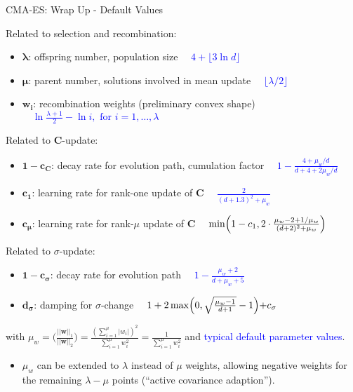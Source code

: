 \documentclass[11pt,compress,t,notes=noshow, xcolor=table]{beamer}
\begin{document}
\begin{vbframe}{CMA-ES: Wrap Up - Default Values} %
\scriptsize{
Related to selection and recombination:

\begin{itemize}
\item $\bm{\lambda}$: offspring number, population size \textcolor{blue}{$\quad 4 + \lfloor 3 \ln d\rfloor$}
\item $\bm{\mu}$: parent number, solutions involved in mean update \textcolor{blue}{$\quad \lfloor \lambda / 2\rfloor$}
\item $\bm{w_i}$: recombination weights (preliminary convex shape) \textcolor{blue}{$\quad \ln \frac{\lambda + 1}{2} - \ln i, \text{ for } i = 1, \dots, \lambda$}
\end{itemize}

Related to $\bm{C}$-update:

\begin{itemize}
\item $\bm{1-c_{\bm{C}}}$: decay rate for evolution path, cumulation factor \textcolor{blue}{$\quad 1- \frac{4+\mu_w/d}{d+4+2\mu_w/d}$}
\item $\bm{c_1}$: learning rate for rank-one update of $\bm{C}$ \textcolor{blue}{$\quad \frac{2}{(d+1.3)^2+\mu_w}$}
\item $\bm{c_{\mu}}$: learning rate for rank-$\mu$ update of $\bm{C}$ \textcolor{blue}{$\quad \min\Bigl(1-c_1, 2\cdot \frac{\mu_w-2+1/\mu_w}{(d+2)^2+\mu_w}\Bigl)$}
\end{itemize}

Related to $\sigma$-update:

\begin{itemize}
\item $\bm{1-c_{\sigma}}$: decay rate for evolution path \textcolor{blue}{$\quad 1- \frac{\mu_w+2}{d+\mu_w+5}$}
\item $\bm{d_{\sigma}}$: damping for $\sigma$-change \textcolor{blue}{$\quad 1+2 \max\Bigl(0, \sqrt{\frac{\mu_w-1}{d+1}}-1\Bigl) + c_\sigma$}
\end{itemize}

with $\mu_w=\bigl(\frac{||\bm{w}||_1}{||\bm{w}||_2}\bigl)=\frac{(\sum_{i=1}^\mu |w_i|)^2}{\sum_{i=1}^\mu w_i^2} = \frac{1}{\sum_{i=1}^\mu w_i^2}$ and \textcolor{blue}{typical default parameter values}.
\vspace{0.2cm}
\begin{itemize}
\item $\mu_w$ can be extended to $\lambda$ instead of $\mu$ weights, allowing negative weights for the remaining $\lambda-\mu$ points (\enquote{active covariance adaption}).
\end{itemize}

}
\end{vbframe}
\end{document}
